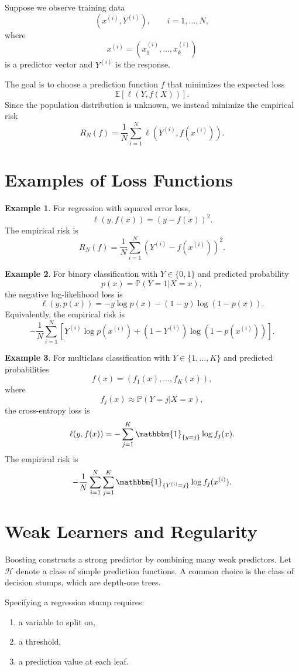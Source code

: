 \documentclass[12pt,oneside]{book}
\numberwithin{equation}{section}
\theoremstyle{definition}
\newtheorem{example}{Example}[section]
\theoremstyle{plain}
\theoremstyle{remark}
\newcommand{\E}{\mathbb{E}}
\newcommand{\Prob}{\mathbb{P}}
\newcommand{\ind}{\mathbbm{1}}
\begin{document}
Suppose we observe training data
\[
(x^{(i)},Y^{(i)}), \qquad i=1,\ldots,N,
\]
where
\[
x^{(i)}=(x_1^{(i)},\ldots,x_k^{(i)})
\]
is a predictor vector and $Y^{(i)}$ is the response.

The goal is to choose a prediction function $f$ that minimizes the expected loss
\[
\E[\ell(Y,f(X))].
\]
Since the population distribution is unknown, we instead minimize the empirical risk
\[
R_N(f)
=
\frac{1}{N}\sum_{i=1}^N \ell(Y^{(i)},f(x^{(i)})).
\]

\section{Examples of Loss Functions}

\begin{example}
For regression with squared error loss,
\[
\ell(y,f(x))=(y-f(x))^2.
\]
The empirical risk is
\[
R_N(f)
=
\frac{1}{N}\sum_{i=1}^N (Y^{(i)}-f(x^{(i)}))^2.
\]
\end{example}

\begin{example}
For binary classification with $Y\in\{0,1\}$ and predicted probability
\[
p(x)=\Prob(Y=1|X=x),
\]
the negative log-likelihood loss is
\[
\ell(y,p(x))
=
-y\log p(x)-(1-y)\log(1-p(x)).
\]
Equivalently, the empirical risk is
\[
-\frac{1}{N}\sum_{i=1}^N
\left[
Y^{(i)}\log p(x^{(i)})
+
(1-Y^{(i)})\log(1-p(x^{(i)}))
\right].
\]
\end{example}

\begin{example}
For multiclass classification with $Y\in\{1,\ldots,K\}$ and predicted probabilities
\[
f(x)=(f_1(x),\ldots,f_K(x)),
\]
where
\[
f_j(x)\approx \Prob(Y=j|X=x),
\]
the cross-entropy loss is
\[
\ell(y,f(x))
=
-\sum_{j=1}^K \ind_{\{y=j\}}\log f_j(x).
\]
The empirical risk is
\[
-\frac{1}{N}\sum_{i=1}^N
\sum_{j=1}^K
\ind_{\{Y^{(i)}=j\}}\log f_j(x^{(i)}).
\]
\end{example}

\section{Weak Learners and Regularity}

Boosting constructs a strong predictor by combining many weak predictors. Let $\mathcal{H}$ denote a class of simple prediction functions. A common choice is the class of decision stumps, which are depth-one trees.

Specifying a regression stump requires:
\begin{enumerate}
\item a variable to split on,
\item a threshold,
\item a prediction value at each leaf.
\end{enumerate}
\end{document}
